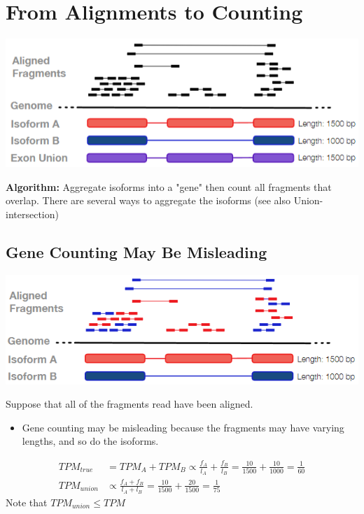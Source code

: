 \documentclass[10pt]{article}
\begin{document}
\section*{From Alignments to Counting}
\begin{center}
    \includegraphics*[scale=0.9]{W5_2.png}
\end{center}
\textbf{Algorithm:} Aggregate isoforms into a "gene" then count all fragments that overlap.  There are several ways to aggregate the isoforms (see also Union-intersection)

\subsection*{Gene Counting May Be Misleading}
\begin{center}
    \includegraphics*[scale=0.9]{W5_3.png}
\end{center}
Suppose that all of the fragments read have been aligned.  
\begin{itemize}
    \item Gene counting may be misleading because the fragments may have varying lengths, and so do the isoforms.
\end{itemize}
\begin{align*}
TPM_{true} &= TPM_A + TPM_B \propto \frac{f_A}{l_A} + \frac{f_B}{l_B} = \frac{10}{1500} + \frac{10}{1000} = \boxed{\frac{1}{60}}\\
TPM_{union} &\propto \frac{f_A + f_B}{l_A + l_B} = \frac{10}{1500} + \frac{20}{1500} = \boxed{\frac{1}{75}}
\end{align*}
Note that $TPM_{union} \leq TPM$
\end{document}
